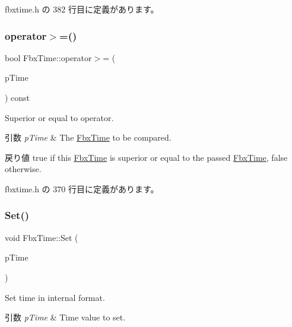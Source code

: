  fbxtime.\+h の 382 行目に定義があります。

\mbox{\label{class_fbx_time_a58d0eaca01e27c24c35026c9329bf892}} 
\subsubsection{\texorpdfstring{operator$>$=()}{operator>=()}}
{\footnotesize\ttfamily bool Fbx\+Time\+::operator$>$= (\begin{DoxyParamCaption}\item[{const \hyperlink{class_fbx_time}{Fbx\+Time} \&}]{p\+Time }\end{DoxyParamCaption}) const\hspace{0.3cm}{\ttfamily [inline]}}

Superior or equal to operator. 
\begin{DoxyParams}{引数}
{\em p\+Time} & The \hyperlink{class_fbx_time}{Fbx\+Time} to be compared. \\
\hline
\end{DoxyParams}
\begin{DoxyReturn}{戻り値}
{\ttfamily true} if this \hyperlink{class_fbx_time}{Fbx\+Time} is superior or equal to the passed \hyperlink{class_fbx_time}{Fbx\+Time}, {\ttfamily false} otherwise. 
\end{DoxyReturn}


 fbxtime.\+h の 370 行目に定義があります。

\mbox{\label{class_fbx_time_ae5d5d3624a3dc7f24fe991f21df4f91b}} 
\subsubsection{\texorpdfstring{Set()}{Set()}}
{\footnotesize\ttfamily void Fbx\+Time\+::\+Set (\begin{DoxyParamCaption}\item[{\hyperlink{fbxtypes_8h_ac34da60c22b0a7e1156e5480da7d71f1}{Fbx\+Long\+Long}}]{p\+Time }\end{DoxyParamCaption})\hspace{0.3cm}{\ttfamily [inline]}}

Set time in internal format. 
\begin{DoxyParams}{引数}
{\em p\+Time} & Time value to set. \\
\hline
\end{DoxyParams}


